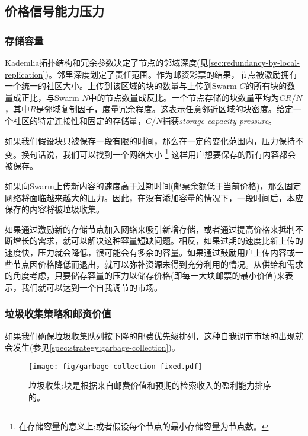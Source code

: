 \subsection{价格信号能力压力}\label{sec:capacity-pressure}

\yellow{}

\subsubsection{存储容量}
Kademlia拓扑结构和冗余参数决定了节点的邻域深度(见\ref{sec:redundancy-by-local-replication})。邻里深度划定了责任范围。作为邮资彩票的结果，节点被激励拥有一个统一的社区大小。上传到该区域的块的数量与上传到Swarm $C$的所有块的数量成正比，与Swarm $N$中的节点数量成反比。一个节点存储的块数量平均为$CR/N$，其中$R$是邻域复制因子，度量冗余程度。这表示任意邻近区域的块密度。给定一个社区的特定连接性和固定的存储量，$C/N$捕获\emph{storage capacity pressure}。 

如果我们假设块只被保存一段有限的时间，那么在一定的变化范围内，压力保持不变。换句话说，我们可以找到一个网络大小%
%
\footnote{在存储容量的意义上;或者假设每个节点的最小存储容量为节点数。}
%
这样用户想要保存的所有内容都会被保存。 

如果向Swarm上传新内容的速度高于过期时间(邮票余额低于当前价格)，那么固定网络将面临越来越大的压力。因此，在没有添加容量的情况下，一段时间后，本应保存的内容将被垃圾收集。 

如果通过激励新的存储节点加入网络来吸引新增存储，或者通过提高价格来抵制不断增长的需求，就可以解决这种容量短缺问题。相反，如果过期的速度比新上传的速度快，压力就会降低，很可能会有多余的容量。如果通过鼓励用户上传内容或一些节点因价格降低而退出，就可以弥补资源未得到充分利用的情况。从供给和需求的角度考虑，只要储存容量的压力以储存价格(即每一大块邮票的最小价值)来表示，我们就可以达到一个自我调节的市场。 

\subsubsection{垃圾收集策略和邮资价值}

如果我们确保垃圾收集队列按下降的邮费优先级排列，这种自我调节市场的出现就会发生(参见\ref{spec:strategy:garbage-collection})。

\begin{figure}[htbp]
  \centering
  \texttt{[image: fig/garbage-collection-fixed.pdf]}
  \caption[垃圾收集\statusgreen]{垃圾收集:块是根据来自邮费价值和预期的检索收入的盈利能力排序的。}
  \label{fig:garbage-collection}
\end{figure}


